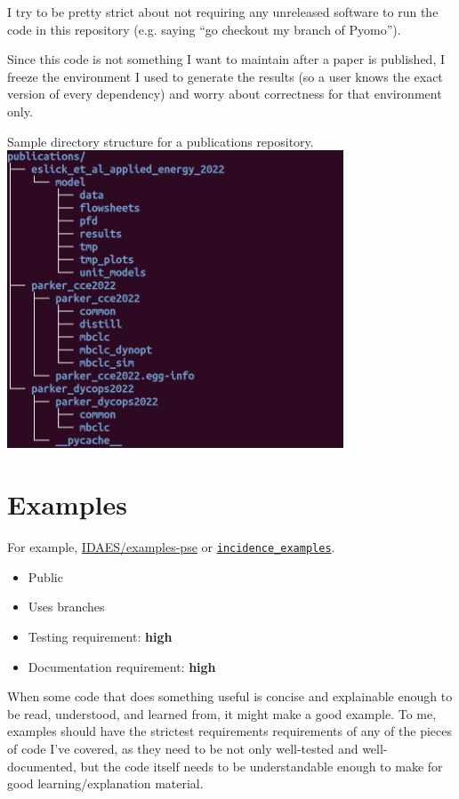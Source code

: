 \documentclass{article}
\begin{document}
I try to be pretty strict about not requiring any unreleased software
to run the code in this repository (e.g. saying ``go checkout my branch
of Pyomo'').

Since this code is not something I want to maintain after a paper is
published, I freeze the environment I used to generate the results
(so a user knows the exact version of every dependency)
and worry about correctness for that environment only.

\begin{center}
  Sample directory structure for a publications repository.\\
  \includegraphics[width=10cm]{publications_tree}
\end{center}

\section{Examples}
For example, \href{https://github.com/IDAES/examples-pse}{IDAES/examples-pse}
or \href{https://github.com/Robbybp/incidence_examples}{\texttt{incidence\_examples}}.
\begin{itemize}
  \item Public
  \item Uses branches
  \item Testing requirement: {\color{red}\bf high}
  \item Documentation requirement: {\color{red}\bf high}
\end{itemize}

When some code that does something useful is concise and explainable
enough to be read, understood, and learned from, it might make a good
example. To me, examples should have the strictest requirements requirements
of any of the pieces of code I've covered, as they need to be not only
well-tested and well-documented, but the code itself needs to be
understandable enough to make for good learning/explanation material.
\end{document}
